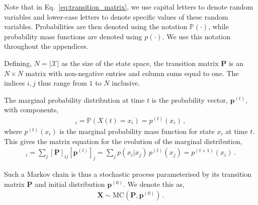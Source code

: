 \documentclass{article}
\begin{document}
Note that in Eq.~\eqref{eq:transition_matrix}, we use capital letters to denote random variables and lower-case letters to denote specific values of these random variables. Probabilities
are then denoted using the notation $\mathbb{P}(\cdot)$, while probability mass functions are denoted using $p(\cdot)$. We use this notation
throughout the appendices.

Defining, $N = |\mathcal{X}|$ as the size of the state space, the transition matrix $\mathbf{P}$ is an $N \times N$ matrix with non-negative entries and
column sums equal to one. The indices $i, j$ thus range from $1$ to $N$ inclusive.

The marginal probability distribution at time $t$ is the probability vector, $\mathbf{p}^{(t)}$, with components,
\begin{align}
    [\mathbf{p}^{(t)}]_i = \mathbb{P}(X(t) = x_i) = p^{(t)}(x_i) \,,
\end{align}
where $p^{(t)}(x_i)$ is the marginal probability mass function for state $x_i$ at time $t$.
This gives the matrix equation for the evolution of the marginal distribution,
\begin{align}
    [\mathbf{p}^{(t+1)}]_i = \sum_{j} [\mathbf{P}]_{i j} [\mathbf{p}^{(t)}]_j =  \sum_{j} p(x_i | x_j) \, p^{(t)}(x_j) = p^{(t+1)}(x_i) \,.
\end{align}

Such a Markov chain is thus a stochastic process parameterised by its transition matrix $\mathbf{P}$ and initial distribution $\mathbf{p}^{(0)}$. We denote this as,
\begin{align}
    \bm{X} \sim \text{MC}(\mathbf{P}, \mathbf{p}^{(0)}) \,.
\end{align}
\end{document}
